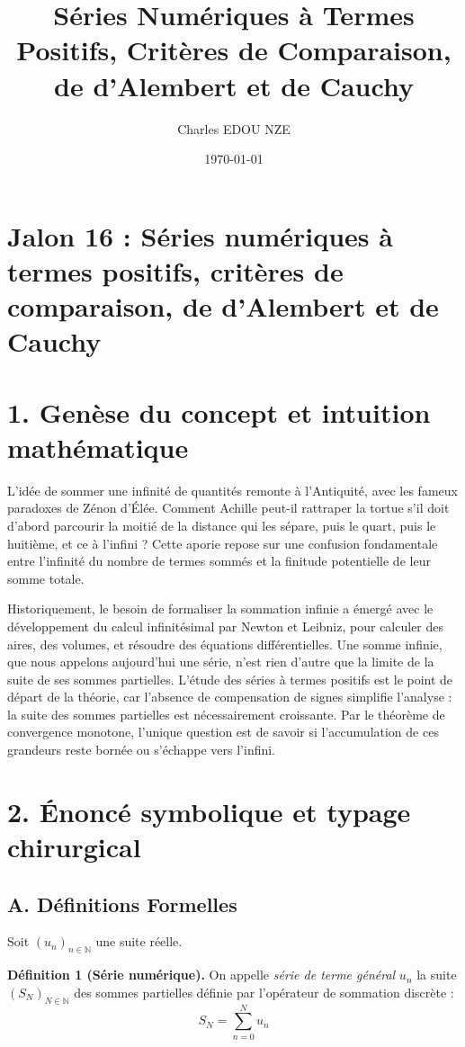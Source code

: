 \documentclass[12pt, a4paper]{article}
\title{Séries Numériques à Termes Positifs, Critères de Comparaison, de d'Alembert et de Cauchy}
\author{Charles EDOU NZE}
\date{\today}
\begin{document}
\maketitle
\tableofcontents
\newpage


\section*{Jalon 16 : Séries numériques à termes positifs, critères de comparaison, de d'Alembert et de Cauchy}

\section{1. Genèse du concept et intuition mathématique}

L'idée de sommer une infinité de quantités remonte à l'Antiquité, avec les fameux paradoxes de Zénon d'Élée. Comment Achille peut-il rattraper la tortue s'il doit d'abord parcourir la moitié de la distance qui les sépare, puis le quart, puis le huitième, et ce à l'infini ? Cette aporie repose sur une confusion fondamentale entre l'infinité du nombre de termes sommés et la finitude potentielle de leur somme totale.

Historiquement, le besoin de formaliser la sommation infinie a émergé avec le développement du calcul infinitésimal par Newton et Leibniz, pour calculer des aires, des volumes, et résoudre des équations différentielles. Une somme infinie, que nous appelons aujourd'hui une série, n'est rien d'autre que la limite de la suite de ses sommes partielles. L'étude des séries à termes positifs est le point de départ de la théorie, car l'absence de compensation de signes simplifie l'analyse : la suite des sommes partielles est nécessairement croissante. Par le théorème de convergence monotone, l'unique question est de savoir si l'accumulation de ces grandeurs reste bornée ou s'échappe vers l'infini.

\section{2. Énoncé symbolique et typage chirurgical}

\subsection{A. Définitions Formelles}

Soit $(u_n)_{n \in \mathbb{N}}$ une suite réelle.

\textbf{Définition 1 (Série numérique).} On appelle \textit{série de terme général} $u_n$ la suite $(S_N)_{N \in \mathbb{N}}$ des sommes partielles définie par l'opérateur de sommation discrète :
$$S_N = \sum_{n=0}^N u_n$$
\end{document}
